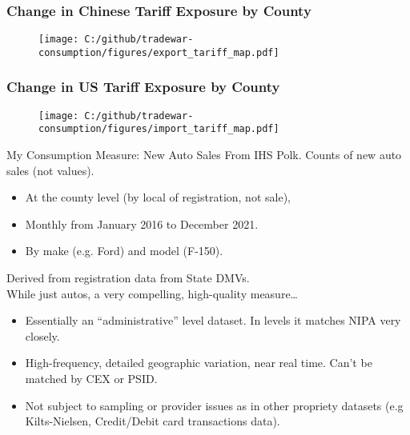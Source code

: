 \documentclass[9pt,pdftex,aspectratio=1610]{beamer}
\theoremstyle{definition}
\begin{document}

\begin{frame}[t]
\frametitle{Change in Chinese Tariff Exposure by County}
\begin{figure}[t]
\centerline{\texttt{[image: C:/github/tradewar-consumption/figures/export\_tariff\_map.pdf]}}
\end{figure}
\end{frame}


\begin{frame}[t]
\frametitle{Change in US Tariff Exposure by County}
\begin{figure}[t]
\centerline{\texttt{[image: C:/github/tradewar-consumption/figures/import\_tariff\_map.pdf]}}
\end{figure}
\end{frame}


\begin{frame}[t]{My Consumption Measure: New Auto Sales}
From IHS Polk. Counts of new auto sales (not values).
\begin{itemize}
\item At the county level (by local of registration, not sale),
\smallskip
\item Monthly from January 2016 to December 2021.
\smallskip
\item By make (e.g. Ford) and model (F-150).
\end{itemize}
\medskip
Derived from registration data from State DMVs.\\
\bigskip
While just autos, a very compelling, high-quality measure\ldots
\begin{itemize}
\item Essentially an ``administrative'' level dataset. In levels it matches NIPA very closely.
\smallskip
\item High-frequency, detailed geographic variation, near real time. Can't be matched by CEX or PSID.
\smallskip
\item Not subject to sampling or provider issues as in other propriety datasets (e.g Kilts-Nielsen, Credit/Debit card transactions data).
\end{itemize}
\end{frame}
\end{document}
